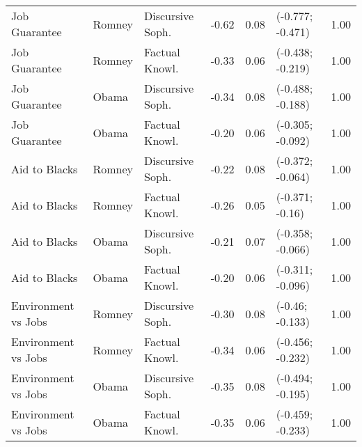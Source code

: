\begin{table}[ht]
\begin{tabular}{lllrrlr}
  Job Guarantee & Romney & Discursive Soph. & -0.62 & 0.08 & (-0.777; -0.471) & 1.00 \\ 
  Job Guarantee & Romney & Factual Knowl. & -0.33 & 0.06 & (-0.438; -0.219) & 1.00 \\ 
  Job Guarantee & Obama & Discursive Soph. & -0.34 & 0.08 & (-0.488; -0.188) & 1.00 \\ 
  Job Guarantee & Obama & Factual Knowl. & -0.20 & 0.06 & (-0.305; -0.092) & 1.00 \\ 
  Aid to Blacks & Romney & Discursive Soph. & -0.22 & 0.08 & (-0.372; -0.064) & 1.00 \\ 
  Aid to Blacks & Romney & Factual Knowl. & -0.26 & 0.05 & (-0.371; -0.16) & 1.00 \\ 
  Aid to Blacks & Obama & Discursive Soph. & -0.21 & 0.07 & (-0.358; -0.066) & 1.00 \\ 
  Aid to Blacks & Obama & Factual Knowl. & -0.20 & 0.06 & (-0.311; -0.096) & 1.00 \\ 
  Environment vs Jobs & Romney & Discursive Soph. & -0.30 & 0.08 & (-0.46; -0.133) & 1.00 \\ 
  Environment vs Jobs & Romney & Factual Knowl. & -0.34 & 0.06 & (-0.456; -0.232) & 1.00 \\ 
  Environment vs Jobs & Obama & Discursive Soph. & -0.35 & 0.08 & (-0.494; -0.195) & 1.00 \\ 
  Environment vs Jobs & Obama & Factual Knowl. & -0.35 & 0.06 & (-0.459; -0.233) & 1.00 \\ 
   \hline
\end{tabular}
\end{table}
